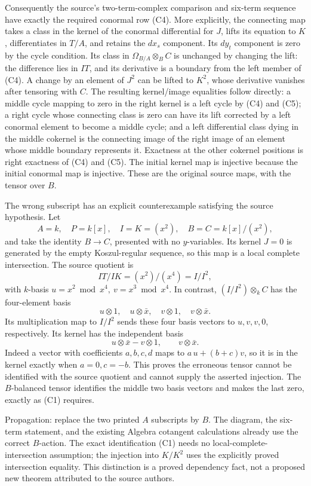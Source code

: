 Consequently the source's two-term-complex comparison and six-term sequence have exactly the required conormal row (C4). More explicitly, the connecting map takes a class in the kernel of the conormal differential for \(J\), lifts its equation to \(K\), differentiates in \(T/A\), and retains the \(dx_s\) component. Its \(dy_t\) component is zero by the cycle condition. Its class in \(\Omega_{B/A}\otimes_B C\) is unchanged by changing the lift: the difference lies in \(IT\), and its derivative is a boundary from the left member of (C4). A change by an element of \(J^2\) can be lifted to \(K^2\), whose derivative vanishes after tensoring with \(C\). The resulting kernel/image equalities follow directly: a middle cycle mapping to zero in the right kernel is a left cycle by (C4) and (C5); a right cycle whose connecting class is zero can have its lift corrected by a left conormal element to become a middle cycle; and a left differential class dying in the middle cokernel is the connecting image of the right image of an element whose middle boundary represents it. Exactness at the other cokernel positions is right exactness of (C4) and (C5). The initial kernel map is injective because the initial conormal map is injective. These are the original source maps, with the tensor over \(B\).

The wrong subscript has an explicit counterexample satisfying the source hypothesis. Let \[
 A=k,\quad P=k[x],\quad I=K=(x^2),\quad
 B=C=k[x]/(x^2),
\] and take the identity \(B\to C\), presented with no \(y\)-variables. Its kernel \(J=0\) is generated by the empty Koszul-regular sequence, so this map is a local complete intersection. The source quotient is \[
 IT/IK=(x^2)/(x^4)=I/I^2,
\] with \(k\)-basis \(u=x^2\bmod x^4,\ v=x^3\bmod x^4\). In contrast, \((I/I^2)\otimes_k C\) has the four-element basis \[
 u\otimes1,\quad u\otimes\bar x,\quad v\otimes1,\quad
 v\otimes\bar x.
\] Its multiplication map to \(I/I^2\) sends these four basis vectors to \(u,v,v,0\), respectively. Its kernel has the independent basis \[
 u\otimes\bar x-v\otimes1,\qquad v\otimes\bar x.
\] Indeed a vector with coefficients \(a,b,c,d\) maps to \(a\,u+(b+c)v\), so it is in the kernel exactly when \(a=0,c=-b\). This proves the erroneous tensor cannot be identified with the source quotient and cannot supply the asserted injection. The \(B\)-balanced tensor identifies the middle two basis vectors and makes the last zero, exactly as (C1) requires.

Propagation: replace the two printed \(A\) subscripts by \(B\). The diagram, the six-term statement, and the existing Algebra cotangent calculations already use the correct \(B\)-action. The exact identification (C1) needs no local-complete-intersection assumption; the injection into \(K/K^2\) uses the explicitly proved intersection equality. This distinction is a proved dependency fact, not a proposed new theorem attributed to the source authors.

